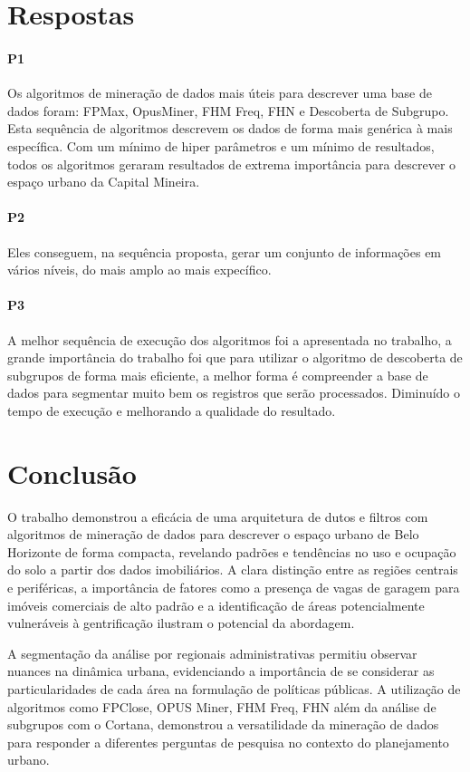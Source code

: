 \documentclass[12pt]{article}
\begin{document}
\section{Respostas}
\paragraph{P1} Os algoritmos de mineração de dados mais úteis para descrever uma base de dados foram: FPMax, OpusMiner, FHM Freq, FHN e Descoberta de Subgrupo. Esta sequência de algoritmos descrevem os dados de forma mais genérica à mais específica. Com um mínimo de hiper parâmetros e um mínimo de resultados, todos os algoritmos geraram resultados de extrema importância para descrever o espaço urbano da Capital Mineira.
\paragraph{P2} Eles conseguem, na sequência proposta, gerar um conjunto de informações em vários níveis, do mais amplo ao mais expecífico.
\paragraph{P3} A melhor sequência de execução dos algoritmos foi a apresentada no trabalho, a grande importância do trabalho foi que para utilizar o algoritmo de descoberta de subgrupos de forma mais eficiente, a melhor forma é compreender a base de dados para segmentar muito bem os registros que serão processados. Diminuído o tempo de execução e melhorando a qualidade do resultado.


\section{Conclusão}
O trabalho demonstrou a eficácia de uma arquitetura de dutos e filtros com algoritmos de mineração de dados para descrever o espaço urbano de Belo Horizonte de forma compacta, revelando padrões e tendências no uso e ocupação do solo a partir dos dados imobiliários. A clara distinção entre as regiões centrais e periféricas, a importância de fatores como a presença de vagas de garagem para imóveis comerciais de alto padrão e a identificação de áreas potencialmente vulneráveis à gentrificação ilustram o potencial da abordagem.

A segmentação da análise por regionais administrativas permitiu observar nuances na dinâmica urbana, evidenciando a importância de se considerar as particularidades de cada área na formulação de políticas públicas. A utilização de algoritmos como FPClose, OPUS Miner, FHM Freq, FHN além da análise de subgrupos com o Cortana, demonstrou a versatilidade da mineração de dados para responder a diferentes perguntas de pesquisa no contexto do planejamento urbano.
\end{document}
